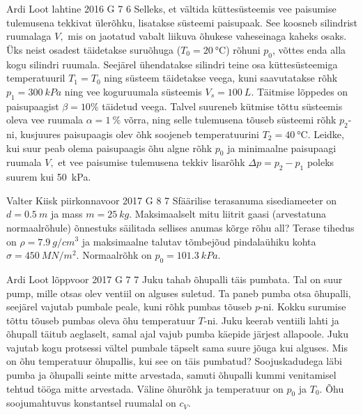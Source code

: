 \documentclass[11pt, twoside]{article}
\begin{document}
{%
{Ardi Loot} %
{lahtine} %
{2016} %
{G 7} %
{6} %
{
\ifStatement
Selleks, et vältida küttesüsteemis vee paisumise tulemusena tekkivat
ülerõhku, lisatakse süsteemi paisupaak. See koosneb silindrist ruumalaga
$V,$ mis on jaotatud vabalt liikuva õhukese vaheseinaga kaheks osaks. Üks
neist osadest täidetakse suruõhuga ($T_{0}=\SI{20}{\celsius}$)
rõhuni $p_{0}$, võttes enda alla kogu silindri ruumala. Seejärel ühendatakse silindri teine osa küttesüsteemiga temperatuuril $T_{1}=T_{0}$ ning süsteem täidetakse
veega, kuni saavutatakse rõhk $p_{1}=\SI{300}{kPa}$ ning vee koguruumala süsteemis $V_{s}=\SI{100}{L}$.
Täitmise lõppedes on paisupaagist $\beta=10\%$ täidetud veega. Talvel suureneb kütmise tõttu süsteemis oleva vee ruumala $\alpha=\SI{1}{\%}$ võrra, ning selle tulemusena tõuseb süsteemi rõhk $p_{2}$-ni, kusjuures paisupaagis olev õhk soojeneb temperatuurini $T_{2}=\SI{40}{\celsius}$. Leidke, kui suur peab olema paisupaagis
õhu algne rõhk $p_{0}$ ja minimaalne paisupaagi ruumala $V,$
et vee paisumise tulemusena tekkiv lisarõhk $\Delta p=p_{2}-p_{1}$
poleks suurem kui \SI{50}{kPa}. 
\fi
}

{Valter Kiisk} %
{piirkonnavoor} %
{2017} %
{G 8} %
{7} %
{
\ifStatement
Sfäärilise terasanuma sisediameeter on $d=\SI{0.5}{m}$ ja mass $m=\SI{25}{kg}$. Maksimaalselt mitu liitrit gaasi (arvestatuna normaalrõhule) õnnestuks säilitada sellises anumas kõrge rõhu all? Terase tihedus on $\rho=\SI{7.9}{g/cm^3}$ ja maksimaalne talutav tõmbejõud pindalaühiku kohta $\sigma=\SI{450}{MN/m^2}$. Normaalrõhk on $p_0=\SI{101.3}{kPa}$.
\fi
}

{Ardi Loot} %
{lõppvoor} %
{2017} %
{G 7} %
{7} %
{
\ifStatement
Juku tahab õhupalli täis pumbata. Tal on suur pump, mille otsas olev ventiil on alguses suletud. Ta paneb pumba otsa õhupalli, seejärel vajutab pumbale peale, kuni rõhk pumbas tõuseb $p$-ni. Kokku surumise tõttu tõuseb pumbas oleva õhu temperatuur $T$-ni. Juku keerab ventiili lahti ja õhupall täitub aeglaselt, samal ajal vajub pumba käepide järjest allapoole. Juku vajutab kogu protsessi vältel pumbale täpselt sama suure jõuga kui alguses. Mis on õhu temperatuur õhupallis, kui see on täis pumbatud? Soojuskadudega läbi pumba ja õhupalli seinte mitte arvestada, samuti õhupalli kummi venitamisel tehtud tööga mitte arvestada. Väline õhurõhk ja temperatuur on $p_0$ ja $T_0$. Õhu soojumahtuvus konstantsel ruumalal on $c_V$.
\fi
}

}
\end{document}
